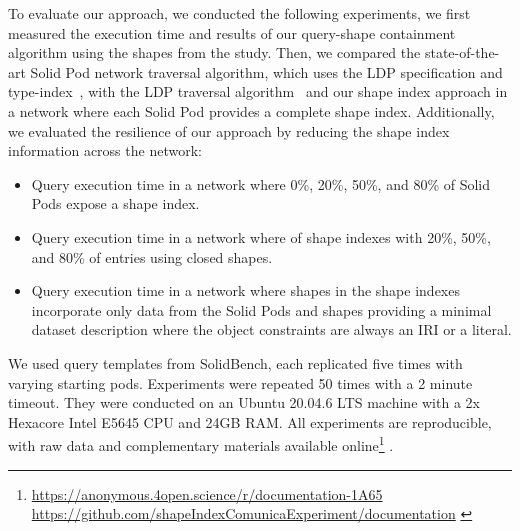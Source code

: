 To evaluate our approach, we conducted the following experiments, we first measured the execution time and results of our query-shape containment algorithm using the shapes from the study.
Then, we compared the state-of-the-art Solid Pod network traversal algorithm, which uses the LDP specification and type-index~\cite{Taelman2023}, with the LDP traversal algorithm~\cite{Taelman2023} and our shape index approach in a network where each Solid Pod provides a complete shape index.
Additionally, we evaluated the resilience of our approach by reducing the shape index information across the network:
\begin{itemize}
   \item Query execution time in a network where 0\%, 20\%, 50\%, and 80\% of Solid Pods expose a shape index.
   \item Query execution time in a network where of shape indexes with 20\%, 50\%, and 80\% of entries using closed shapes.
   \item Query execution time in a network where shapes in the shape indexes incorporate only data from the Solid Pods and shapes providing a minimal dataset description where the object constraints are always an IRI or a literal.%
\end{itemize}
We used query templates from SolidBench, each replicated five times with varying starting pods.
Experiments were repeated 50 times with a 2 minute timeout. 
They were conducted on an Ubuntu 20.04.6 LTS machine with a 2x Hexacore Intel E5645 CPU and 24GB RAM.
All experiments are reproducible, with raw data and complementary materials available online\footnote{
\ifanonymous
   \url{https://anonymous.4open.science/r/documentation-1A65}
\else
   \url{https://github.com/shapeIndexComunicaExperiment/documentation}
\fi 
\label{sf:complementaryMaterial}} .


